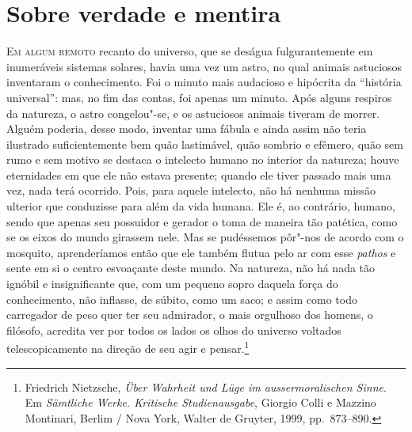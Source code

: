 \chapter*{Sobre verdade e mentira}

\sectionitem
\noindent\textsc{Em algum remoto} recanto do universo, que se deságua fulgurantemente em
inumeráveis sistemas solares, havia uma vez um astro, no qual animais
astuciosos inventaram o conhecimento. Foi o minuto mais audacioso e
hipócrita da “história universal”: mas, no fim das contas, foi apenas
um minuto. Após alguns respiros da natureza, o astro congelou"-se, e
os astuciosos animais tiveram de morrer. Alguém poderia, desse modo,
inventar uma fábula e ainda assim não teria ilustrado suficientemente
bem quão lastimável, quão sombrio e efêmero, quão sem rumo e sem motivo
se destaca o intelecto humano no interior da natureza; houve
eternidades em que ele não estava presente; quando ele tiver passado
mais uma vez, nada terá ocorrido. Pois, para aquele intelecto, não há
nenhuma missão ulterior que conduzisse para além da vida humana. Ele é,
ao contrário, humano, sendo que apenas seu possuidor e gerador o toma
de maneira tão patética, como se os eixos do mundo girassem nele. 
Mas se pudéssemos pôr"-nos de acordo com o mosquito, aprenderíamos então
que ele também flutua pelo ar com esse \textit{pathos} e sente em si o
centro esvoaçante deste mundo. Na natureza, não há nada tão ignóbil e
insignificante que, com um pequeno sopro daquela força do conhecimento,
não inflasse, de súbito, como um saco; e assim como todo carregador de
peso quer ter seu admirador, o mais orgulhoso dos homens, o filósofo,
acredita ver por todos os lados os olhos do universo voltados
telescopicamente na direção de seu agir e pensar.\footnote{ Friedrich Nietzsche,
\textit{Über Wahrheit und Lüge im aussermoralischen Sinne}.
Em \textit{Sämtliche Werke. Kritische Studienausgabe},
Giorgio Colli e Mazzino Montinari, Berlim / Nova
York, Walter de Gruyter, 1999, pp.~873--890.}

